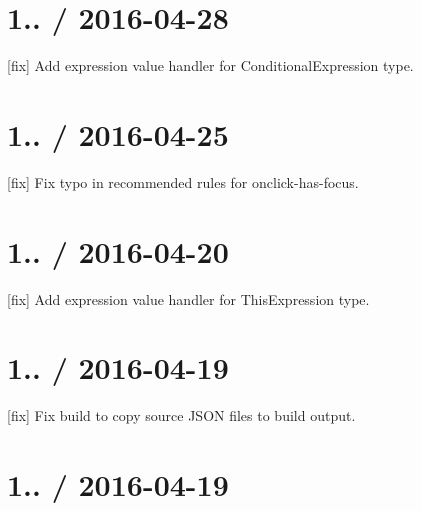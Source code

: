\section*{1.. / 2016-\/04-\/28 }


\begin{DoxyItemize}
\item \mbox{[}fix\mbox{]} Add expression value handler for {\ttfamily Conditional\+Expression} type.
\end{DoxyItemize}

\section*{1.. / 2016-\/04-\/25 }


\begin{DoxyItemize}
\item \mbox{[}fix\mbox{]} Fix typo in recommended rules for {\ttfamily onclick-\/has-\/focus}.
\end{DoxyItemize}

\section*{1.. / 2016-\/04-\/20 }


\begin{DoxyItemize}
\item \mbox{[}fix\mbox{]} Add expression value handler for {\ttfamily This\+Expression} type.
\end{DoxyItemize}

\section*{1.. / 2016-\/04-\/19 }


\begin{DoxyItemize}
\item \mbox{[}fix\mbox{]} Fix build to copy source J\+S\+ON files to build output.
\end{DoxyItemize}

\section*{1.. / 2016-\/04-\/19 }


